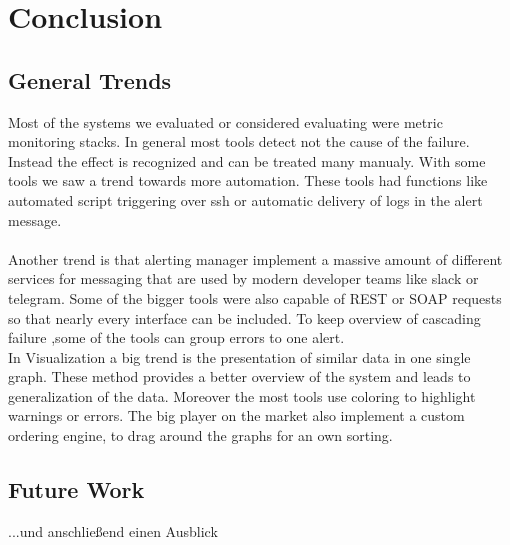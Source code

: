 
\chapter{Conclusion}\label{chap:conclusion}
\section{General Trends}
Most of the systems we evaluated or considered evaluating were metric monitoring stacks. In general most tools detect not the cause of the failure. Instead the effect is recognized and can be treated many manualy. With some tools we saw a trend towards more automation. These tools had functions like automated script triggering over ssh or automatic delivery of logs in the alert message. \\
\\
Another trend is that alerting manager implement a massive amount of different services for messaging that are used by modern developer teams like slack or telegram. Some of the bigger tools were also capable of REST or SOAP requests so that nearly every interface can be included. To keep overview of cascading failure ,some of the tools can group errors to one alert.
\\
In Visualization a big trend is the presentation of similar data in one single graph. These method provides a better overview of the system and leads to generalization of the data. Moreover the most tools use coloring to highlight warnings or errors. The big player on the market also implement a custom ordering engine, to drag around the graphs for an own sorting.
\\


\section*{Future Work}
...und anschließend einen Ausblick

